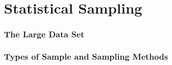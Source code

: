 \documentclass[../maths.tex]{subfiles}
\begin{document}
\chapter{Statistical Sampling}
\subsection*{The Large Data Set}
\subsection*{Types of Sample and Sampling Methods}
\end{document}
